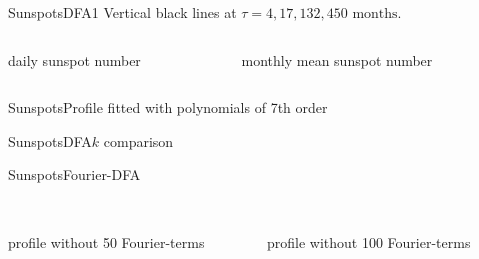 \documentclass{beamer}
\begin{document}
\begin{frame}{Sunspots}{DFA1}	
		\small{Vertical black lines at $\tau = 4,17, 132, 450 \text{ months}$.}
	\begin{columns}
		\begin{column}{.47\textwidth}
			\centering
			\begin{block}{\small{daily sunspot number}}
			\scalebox{.7}{}
			\end{block}
		\end{column}
		\hfill
		\begin{column}{.47\textwidth}
			\centering
			\begin{block}{\small{monthly mean sunspot number}}
			\scalebox{.7}{}
			\end{block}
		\end{column}
	\end{columns}
\end{frame}

\begin{frame}{Sunspots}{Profile fitted with polynomials of 7th order}
			\centering
			\scalebox{.7}{}
\end{frame}

\begin{frame}{Sunspots}{DFA$k$ comparison}
		\centering
		\scalebox{.7}{}
\end{frame}

\begin{frame}{Sunspots}{Fourier-DFA}
	\begin{columns}
		\begin{column}{.47\textwidth}
				\centering
				\scalebox{.6}{}
				\\\vspace{1ex}
				\tiny{profile without 50 Fourier-terms}
		\end{column}
		\hfill
		\begin{column}{.47\textwidth}
				\centering
				\scalebox{.6}{}
				\\\vspace{1ex}
				\tiny{profile without 100 Fourier-terms}
		\end{column}
	\end{columns}
	\vfill
		\centering
		\scalebox{.5}{}
\end{frame}
\end{document}
